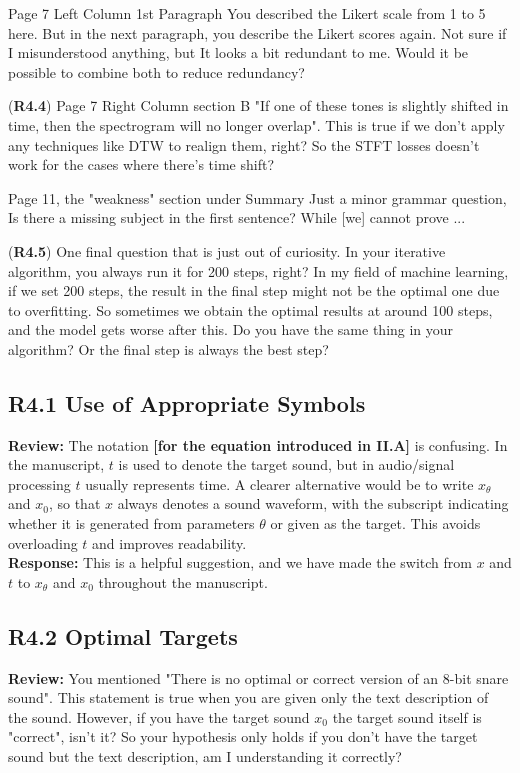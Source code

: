 \documentclass[11pt]{article}
\begin{document}
Page 7 Left Column 1st Paragraph
You described the Likert scale from 1 to 5 here. But in the next paragraph, you describe the Likert scores again. Not sure if I misunderstood anything, but It looks a bit redundant to me. Would it be possible to combine both to reduce redundancy?

(\textbf{R4.4}) Page 7 Right Column section B
"If one of these tones is slightly shifted in time, then the spectrogram will no longer overlap". This is true if we don't apply any techniques like DTW to realign them, right?
So the STFT losses doesn't work for the cases where there's time shift?

Page 11, the "weakness" section under Summary
Just a minor grammar question, Is there a missing subject in the first sentence?
While [we] cannot prove ...


(\textbf{R4.5}) One final question that is just out of curiosity.
In your iterative algorithm, you always run it for 200 steps, right?
In my field of machine learning, if we set 200 steps, the result in the final step might not be the optimal one due to overfitting. So sometimes we obtain the optimal results at around 100 steps, and the model gets worse after this.
Do you have the same thing in your algorithm? Or the final step is always the best step?



\subsection{\textbf{R4.1} Use of Appropriate Symbols}
\noindent\textbf{Review:}
The notation \textbf{[for the equation introduced in II.A]} is confusing. In the manuscript, $t$ is used to denote the target sound, but in audio/signal processing $t$ usually represents time.  
A clearer alternative would be to write $x_\theta$ and $x_0$, so that $x$ always denotes a sound waveform, with the subscript indicating whether it is generated from parameters $\theta$ or given as the target.  
This avoids overloading $t$ and improves readability.
\\

\noindent\textbf{Response:}
This is a helpful suggestion, and we have made the switch from $x$ and $t$ to $x_{\theta}$ and $x_0$ throughout the manuscript. 

\subsection{\textbf{R4.2} Optimal Targets}
\noindent\textbf{Review:}
You mentioned "There is no optimal or correct version of an 8-bit snare sound".
This statement is true when you are given only the text description of the sound. However, if you have the target sound $x_0$  the target sound itself is "correct", isn't it? So your hypothesis only holds if you don't have the target sound but the text description, am I understanding it correctly?\\
\end{document}
